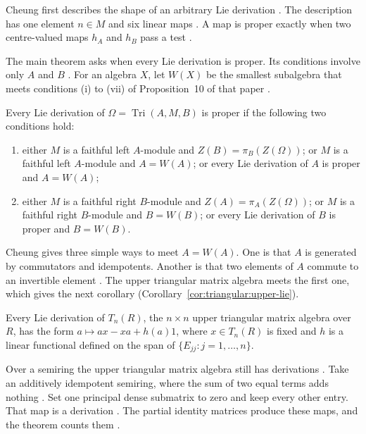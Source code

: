 Cheung first describes the shape of an arbitrary Lie derivation
\cite[Proposition~4, p.~302]{Cheung2003}. The description has one element
$n\in M$ and six linear maps \cite[Proposition~4, p.~302]{Cheung2003}. A map is
proper exactly when two centre-valued maps $h_A$ and $h_B$ pass a test
\cite[Theorem~6, p.~303]{Cheung2003}.

The main theorem asks when every Lie derivation is proper. Its conditions
involve only $A$ and $B$ \cite[Theorem~11, p.~307]{Cheung2003}. For an algebra
$X$, let $W(X)$ be the smallest subalgebra that meets conditions (i) to (vii) of
Proposition~10 of that paper \cite[Proposition~10, p.~305]{Cheung2003}.

\begin{theorem}\label{thm:triangular:proper-lie}
Every Lie derivation of $\Omega=\operatorname{Tri}(A,M,B)$ is proper if the
following two conditions hold:
\begin{enumerate}
\item either $M$ is a faithful left $A$-module and $Z(B)=\pi_B(Z(\Omega))$; or $M$
is a faithful left $A$-module and $A=W(A)$; or every Lie derivation of $A$ is
proper and $A=W(A)$;
\item either $M$ is a faithful right $B$-module and $Z(A)=\pi_A(Z(\Omega))$; or $M$
is a faithful right $B$-module and $B=W(B)$; or every Lie derivation of $B$ is
proper and $B=W(B)$.
\end{enumerate}
\end{theorem}

Cheung gives three simple ways to meet $A=W(A)$. One is that $A$ is generated
by commutators and idempotents. Another is that two elements of $A$ commute to
an invertible element \cite[p.~307]{Cheung2003}. The upper triangular matrix
algebra meets the first one, which gives the next corollary (Corollary~\ref{cor:triangular:upper-lie}).

\begin{corollary}\label{cor:triangular:upper-lie}
Every Lie derivation of $T_n(R)$, the $n\times n$ upper triangular matrix algebra
over $R$, has the form $a\mapsto ax-xa+h(a)1$, where $x\in T_n(R)$ is fixed and
$h$ is a linear functional defined on the span of $\{E_{jj}:j=1,\dots,n\}$.
\end{corollary}

Over a semiring the upper triangular matrix algebra still has derivations
\cite[p.~5]{Vladeva2018Semirings}. Take an additively idempotent semiring, where
the sum of two equal terms adds nothing \cite[p.~2]{Vladeva2018Semirings}. Set
one principal dense submatrix to zero and keep every other entry. That map is a
derivation \cite[Theorem~1, p.~5]{Vladeva2018Semirings}. The partial identity
matrices produce these maps, and the theorem counts them
\cite[p.~5]{Vladeva2018Semirings}.

